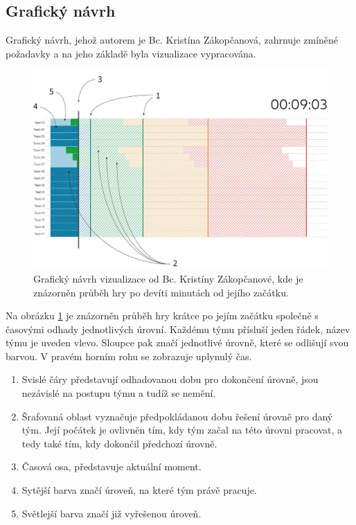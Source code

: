 \documentclass[
  digital, %
  oneside, %
  table,   %
  nolof,     %
  nolot,     %
]{fithesis3}
\begin{document}
\subsection{Grafický návrh}
Grafický návrh, jehož autorem je Bc. Kristína Zákopčanová, zahrnuje zmíněné požadavky a na jeho základě byla vizualizace vypracována.\par
\begin{figure}[h]
  \begin{center}
    \includegraphics[width=12.7cm]{images/navrh-vizualizace-1-4.png}
  \end{center}
  \caption{Grafický návrh vizualizace od Bc. Kristíny Zákopčanové, kde je znázorněn průběh hry po devíti minutách od jejího začátku.}
  \label{fig:progress1}
\end{figure}
Na obrázku \ref{fig:progress1} je znázorněn průběh hry krátce po jejím začátku společně s časovými odhady jednotlivých úrovní. Každému týmu přísluší jeden řádek, název týmu je uveden vlevo. Sloupce pak značí jednotlivé úrovně, které se odlišují svou barvou. V pravém horním rohu se zobrazuje uplynulý čas.
\begin{enumerate}
  \item Svislé čáry představují odhadovanou dobu pro dokončení úrovně, jsou nezávislé na postupu týmu a tudíž se nemění.
  \item Šrafovaná oblast vyznačuje předpokládanou dobu řešení úrovně pro daný tým. Její počátek je ovlivněn tím, kdy tým začal na této úrovni pracovat, a tedy také tím, kdy dokončil předchozí úrovně.
  \item Časová osa, představuje aktuální moment.
  \item Sytější barva značí úroveň, na které tým právě pracuje.
  \item Světlejší barva značí již vyřešenou úroveň.
\end{enumerate}
\end{document}
